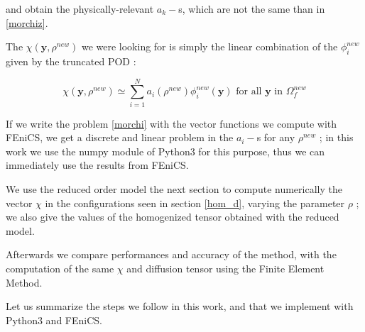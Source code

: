 and obtain the physically-relevant $a_k -$s, which are not the same than in \ref{morchiz}.

\par
The $\chi(\mathbf{y},\rho^{new})$ we were looking for is simply the linear combination of the $\phi_i^{new}$ given by the truncated POD :

\begin{equation}\label{newrom}
\chi\left(\mathbf{y},\rho^{new}\right)\simeq \sum\limits_{i=1}^N a_i \left(\rho^{new}\right)\phi_i^{new}(\mathbf{y})\text{ for all $\mathbf{y}$ in $\Omega_f^{new}$}
\end{equation}

\par
If we write the problem \ref{morchi} with the vector functions we compute with FEniCS, %
we get a discrete and linear problem in the $a_i-$s for any $\rho^{new}$ ; %
in this work we use the numpy module of Python3 for this purpose, thus we can immediately use the results from FEniCS.

\par
We use the reduced order model the next section to compute numerically the vector $\chi$ in the configurations seen in section \ref{hom_d}, %
varying the parameter $\rho$ ; we also give the values of the homogenized tensor obtained with the reduced model.

\par
Afterwards we compare performances and accuracy of the method, with the computation of the same $\chi$ and diffusion tensor using the Finite Element Method.

\par
Let us summarize the steps we follow in this work, and that we implement with Python3 and FEniCS.

